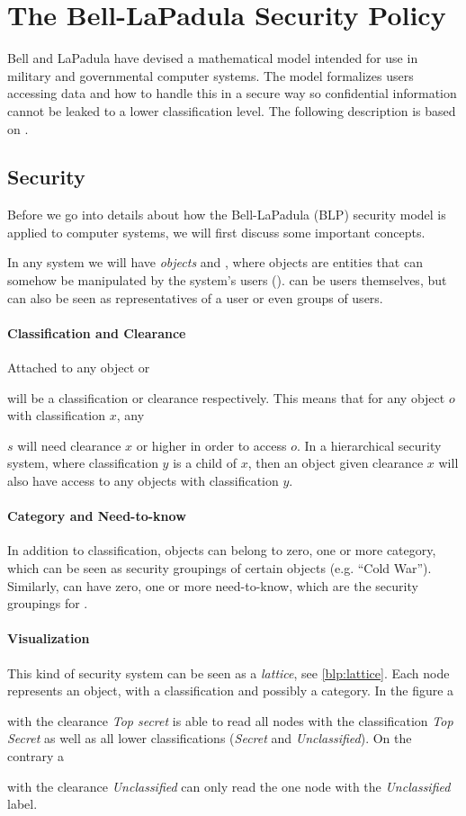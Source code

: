 \section{The Bell-LaPadula Security Policy}

Bell and LaPadula have devised a mathematical model intended for use in  military and governmental computer systems.
The model formalizes users accessing data and how to handle this in a secure way so confidential information cannot be leaked to a lower classification level.
The following description is based on \citet{lapadula1996secure}.

\subsection{Security}
Before we go into details about how the Bell-LaPadula (BLP) security model is applied to computer systems, we will first discuss some important concepts.

In any system we will have \textit{objects} and \textit{\subjects{}}, where objects are entities that can somehow be manipulated by the system's users (\subjects{}).
\Subjects{} can be users themselves, but can also be seen as representatives of a user or even groups of users.

\paragraph{Classification and Clearance}
Attached to any object or \subject{} will be a classification or clearance respectively.
This means that for any object $o$ with classification $x$, any \subject{} $s$ will need clearance $x$ or higher in order to access $o$.
In a hierarchical security system, where classification $y$ is a child of $x$, then an object given clearance $x$ will also have access to any objects with classification $y$.

\paragraph{Category and Need-to-know}
In addition to classification, objects can belong to zero, one or more category, which can be seen as security groupings of certain objects (e.g. ``Cold War'').
Similarly, \subjects{} can have zero, one or more need-to-know, which are the security groupings for \subjects{}.

\paragraph{Visualization}
This kind of security system can be seen as a \textit{lattice}, see \cref{blp:lattice}.
Each node represents an object, with a classification and possibly a category.
In the figure a \subject{} with the clearance \emph{Top secret} is able to read all nodes with the classification \emph{Top Secret} as well as all lower classifications (\emph{Secret} and \emph{Unclassified}).
On the contrary a \subject{} with the clearance \emph{Unclassified} can only read the one node with the \emph{Unclassified} label.

